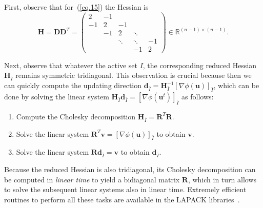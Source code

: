 \documentclass[twoside,11pt]{article}
\newcommand{\vd}{\bm{d}}       \newcommand{\vdh}{\hat{\bm{d}}}        \newcommand{\dhat}{\hat{d}}  \newcommand{\vdt}{\tilde{\bm{d}}}       \newcommand{\dt}{\tilde{d}}
\newcommand{\vu}{\bm{u}}       \newcommand{\vuh}{\hat{\bm{u}}}        \newcommand{\uh}{\hat{u}}    \newcommand{\vut}{\tilde{\bm{u}}}       \newcommand{\ut}{\tilde{u}}
\newcommand{\vv}{\bm{v}}       \newcommand{\vvh}{\hat{\bm{v}}}        \newcommand{\vh}{\hat{v}}    \newcommand{\vvt}{\tilde{\bm{v}}}       \newcommand{\vtild}{\tilde{v}}
\newcommand{\md}{\bm{D}}
\newcommand{\mH}{\bm{H}}
\newcommand{\mr}{\bm{R}}
\newcommand{\reals}{\mathbb{R}}
\numberwithin{equation}{section}
\numberwithin{theorem}{section}
\begin{document}
First, observe that for~(\ref{eq.15}) the Hessian is
\begin{equation*}
 \mH  = \md\md^T = \left( \begin{array}{ccccc}
                  2  & -1 &        &        &     \\
                  -1 &  2 & -1     &        &     \\
                     & -1 &  2     & \ddots &     \\
                     &    & \ddots & \ddots & -1  \\
                     &    &        &   -1   &  2
                 \end{array} \right) \in \reals^{(n-1) \times (n-1)} .
\end{equation*}

Next, observe that whatever the active set $I$, the corresponding reduced Hessian $\mH_{\bar{I}}$ remains symmetric tridiagonal. This observation is crucial because then we can quickly compute the updating direction $\vd_{\bar{I}} = \mH_{\bar{I}}^{-1}[\nabla\phi(\vu)]_{\bar{I}}$, which can be done by solving the linear system $\mH_{\bar{I}}\vd_{\bar{I}} = [\nabla \phi(\vu^t)]_{\bar{I}}$ as follows:

\begin{enumerate}
  \setlength{\itemsep}{0pt}
 \item Compute the Cholesky decomposition $\mH_{\bar{I}} = \mr^T\mr$.
 \item Solve the linear system $\mr^T \vv = [\nabla\phi(\vu)]_{\bar{I}}$ to obtain $\vv$.
 \item Solve the linear system $\mr \vd_{\bar{I}} = \vv$ to obtain $\vd_{\bar{I}}$.
\end{enumerate}

Because the reduced Hessian is also tridiagonal, its Cholesky decomposition can be computed in \emph{linear time} to yield a bidiagonal matrix $\mr$, which in turn allows to solve the subsequent linear systems also in linear time. Extremely efficient routines to perform all these tasks are available in the LAPACK libraries~\citep{LAPACK}.
\end{document}
